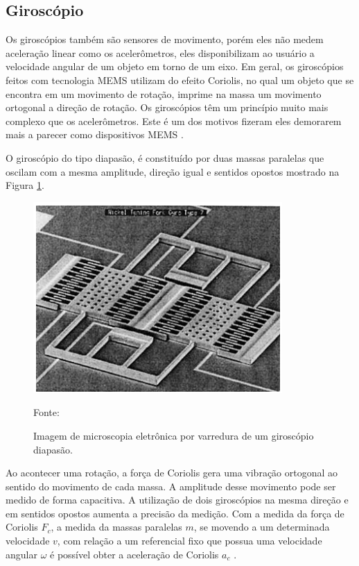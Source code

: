 		\subsection{Giroscópio}
			
			Os giroscópios também são sensores de movimento, porém eles não medem aceleração linear como os acelerômetros, eles disponibilizam ao usuário a velocidade angular de um objeto em torno de um eixo. Em geral, os giroscópios feitos com tecnologia MEMS utilizam do efeito Coriolis, no qual um objeto que se encontra em um movimento de rotação, imprime na massa um movimento ortogonal a direção de rotação. Os giroscópios têm um princípio muito mais complexo que os acelerômetros. Este é um dos motivos fizeram eles demorarem mais a parecer como dispositivos MEMS \cite{almeida2014}.
			
			O giroscópio do tipo diapasão, é constituído por duas massas paralelas que oscilam com a mesma amplitude, direção igual e sentidos opostos mostrado na Figura \ref{gyro}.
			
			\begin{figure}[h]
				\centering
				\includegraphics[keepaspectratio=true,scale=0.7
				]{figuras/diapasao.png}
				\caption{ Imagem de microscopia eletrônica por varredura de um giroscópio diapasão.}
				Fonte: \cite{forhan2010}
				\label{gyro}	
			\end{figure}
			
			Ao acontecer uma rotação, a força de Coriolis gera uma vibração ortogonal ao sentido do movimento de cada massa. A amplitude desse movimento pode ser medido de forma capacitiva. A utilização de dois giroscópios na mesma direção e em sentidos opostos aumenta a precisão da medição. Com a medida da força de Coriolis  $F_{c}$, a medida da massas paralelas $m$, se movendo a um determinada velocidade $v$, com relação a um referencial fixo que possua uma velocidade angular $ \omega $ é possível obter a aceleração de Coriolis $a_{c}$ \cite{forhan2010}.
			
